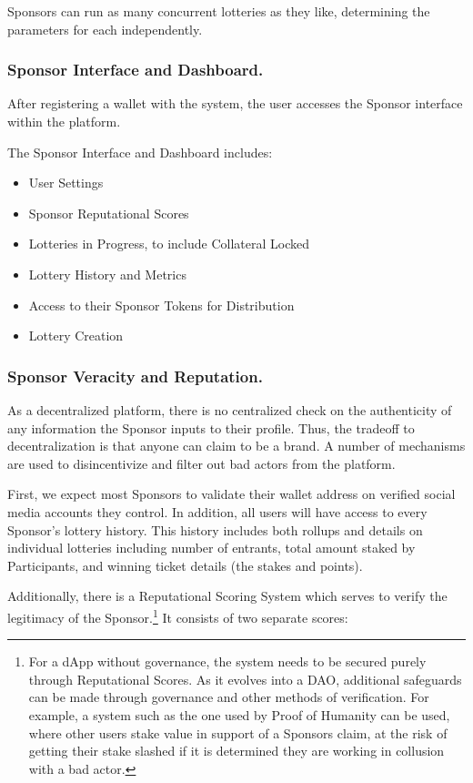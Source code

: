 \documentclass[runningheads]{llncs}
\begin{document}
Sponsors can run as many concurrent lotteries as they like, determining the parameters for each independently.

\subsubsection{Sponsor Interface and Dashboard.}
After registering a wallet with the system, the user accesses the Sponsor interface within the platform.  


The Sponsor Interface and Dashboard includes:
\begin{itemize}
\item User Settings 
\item Sponsor Reputational Scores
\item Lotteries in Progress, to include Collateral Locked
\item Lottery History and Metrics
\item Access to their Sponsor Tokens for Distribution
\item Lottery Creation
\end{itemize}


\subsubsection{Sponsor Veracity and Reputation.}  As a decentralized platform, there is no centralized check on the authenticity of any information the Sponsor inputs to their profile.  Thus, the tradeoff to decentralization is that anyone can claim to be a brand.  A number of mechanisms are used to disincentivize and filter out bad actors from the platform.

First, we expect most Sponsors to validate their wallet address on verified social media accounts they control.  In addition, all users will have access to every Sponsor’s lottery history.  This history includes both rollups and details on individual lotteries including number of entrants, total amount staked by Participants, and winning ticket details (the stakes and points).  

Additionally, there is a Reputational Scoring System which serves to verify the legitimacy of the Sponsor.\footnote{For a dApp without governance, the system needs to be secured purely through Reputational Scores.  As it evolves into a DAO, additional safeguards can be made through governance and other methods of verification.  For example, a system such as the one used by Proof of Humanity can be used, where other users stake value in support of a Sponsors claim, at the risk of getting their stake slashed if it is determined they are working in collusion with a bad actor.}  It consists of two separate scores:
\end{document}
